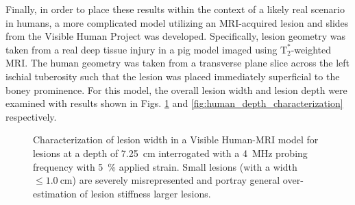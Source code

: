 			Finally, in order to place these results within the context of a likely real scenario in humans, a more complicated model utilizing an MRI-acquired lesion and slides from the Visible Human Project \cite{visiblehuman} was developed. Specifically, lesion geometry was taken from a real deep tissue injury in a pig model imaged using $\mathrm{T}_2^*$-weighted MRI. The human geometry was taken from a transverse plane slice across the left ischial tuberosity such that the lesion was placed immediately superficial to the boney prominence. For this model, the overall lesion width and lesion depth were examined with results shown in Figs. \ref{fig:human_size_characterization} and \ref{fig:human_depth_characterization} respectively.

			\begin{figure}[!htb]
				\centering
				\caption[Quasi-static Visible Human model lesion width characterization]{Characterization of lesion width in a Visible Human-MRI model for lesions at a depth of \SI{7.25}{\cm} interrogated with a \SI{4}{\MHz} probing frequency with \SI{5}{\percent} applied strain. Small lesions (with a width $\leq \SI{1.0}{\cm}$) are severely misrepresented and portray general over-estimation of lesion stiffness larger lesions.}
				\label{fig:human_size_characterization}
			\end{figure}


